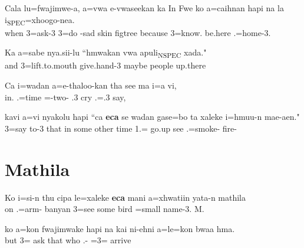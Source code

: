 \ea
\gll 	Cala lu=fwajimwe-a, a=vwa e-vwaseekan ka In Fwe ko a=caihnan hapi na la i\textsubscript{{\upshape SPEC}}=xhoogo-nea.\\ when 3=ask-3 3=do -sad  skin figtree because 3=know.   be.here .=home-3.	\\ \glt  {}		
\z 

\ea
\gll 	Ka a=sabe nya.sii-lu ``hmwakan vwa apuli\textsubscript{{\upshape NSPEC}} xada."	\\	and 3=lift.to.mouth give.hand-3 maybe  people up.there	\\ \glt  {}	
\z 

\ea
\gll Ca i=wadan a=e-thaloo-kan tha see ma i=a vi,\\
     in. .=time =-two- .3 cry  .=.3 say,\\ 
     \glt  {}		
\z

\ea
\gll kavi a=vi nyakolu hapi ``ca \textbf{eca} se wadan gase=bo ta xaleke i=hmuu-n mae-aen."\\  3=say to-3 that in some other time 1.= go.up see	.=smoke- fire-\\ \glt {}
\z


\section{Mathila}

\ea
\gll Ko i=si-n thu cipa le=xaleke \textbf{eca} mani a=xhwatiin yata-n mathila\\ 
     on .=arm- banyan  3=see some bird =small name-3. M.\\ 
     \glt {}	
\z

\ea
\gll ko a=kon fwajimwake hapi na kai ni-ehni a=le=kon bwaa hma.\\ but 3= ask that   who .- =3=  arrive\\ \glt {}
\z

